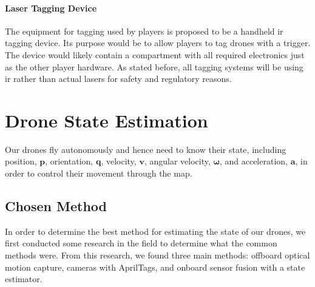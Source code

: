 \documentclass{report_template_oxford}
\begin{document}
\paragraph{Laser Tagging Device}

The equipment for tagging used by players is proposed to be a handheld \gls{ir} tagging device. Its purpose would be to allow players to tag drones with a trigger. The device would likely contain a compartment with all required electronics just as the other player hardware. As stated before, all tagging systems will be using \gls{ir} rather than actual lasers for safety and regulatory reasons.


\newpage

 \section{Drone State Estimation} \label{drone state estimation} %

Our drones fly autonomously and hence need to know their state, including position, $\mathbf{p}$, orientation, $\mathbf{q}$, velocity, $\mathbf{v}$, angular velocity, $\boldsymbol{\omega}$, and acceleration, $\mathbf{a}$, in order to control their movement through the map. 

\subsection{Chosen Method}
In order to determine the best method for estimating the state of our drones, we first conducted some research in the field to determine what the common methods were. From this research, we found three main methods: offboard optical motion capture, cameras with AprilTags, and onboard sensor fusion with a state estimator. 
\end{document}
